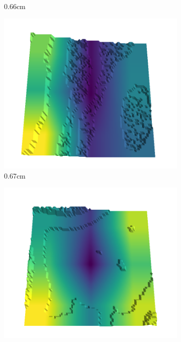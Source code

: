 \documentclass[../document.tex]{subfiles}
\begin{document}
\begin{figure}[H]
\begin{subfigure}[b]{0.192\linewidth}
    \caption{0.66cm}
    \label{fig : quarry-best-16}
    \end{subfigure}
    \begin{subfigure}[b]{0.192\linewidth}
    \includegraphics[width=\linewidth]{../img/5/quarry/best/67-patch-3d-majavi-colormap-170.png}
    \caption{0.67cm}
    \label{fig : quarry-best-17}
    \end{subfigure}
    \begin{subfigure}[b]{0.192\linewidth}
    \includegraphics[width=\linewidth]{../img/5/quarry/best/68-patch-3d-majavi-colormap-180.png}

\end{subfigure}
\end{figure}
\end{document}
